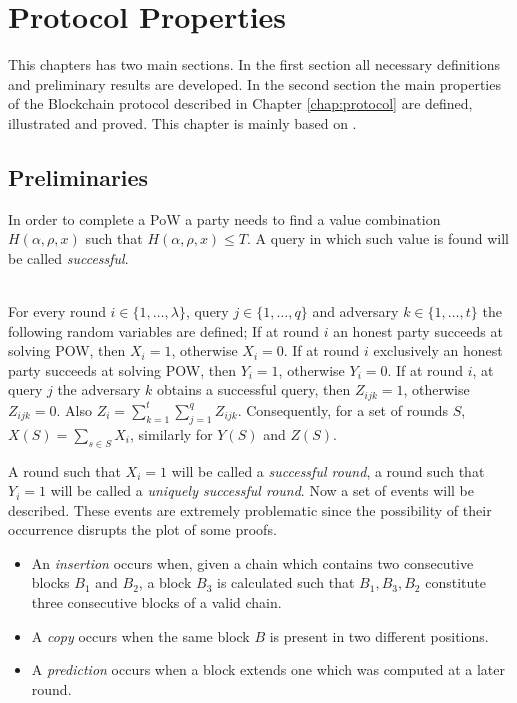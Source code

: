 \documentclass[..]{subfiles}
\begin{document}
\chapter{Protocol Properties}\label{chap:properties}

This chapters has two main sections. In the first section all necessary definitions and preliminary results are developed. In the second section the main properties of the Blockchain protocol described in Chapter \ref{chap:protocol} are defined, illustrated and proved. This chapter is mainly based on \cite{garay2015bitcoin}.


\section{Preliminaries}

In order to complete a PoW a party needs to find a value combination $H(\alpha, \rho, x)$ such that $H(\alpha, \rho, x) \le T$. A query in which such value is found will be called \textit{successful}.

\begin{definition}
	\mbox{}\\
	\normalfont
	For every round $i \in \{1,\dots,\lambda\}$, query $j \in \{1,\dots,q\}$ and adversary $k \in \{1, \dots,t\}$ the following random variables are defined; If at round $i$ an honest party succeeds at solving POW, then $X_i = 1$, otherwise $X_i = 0$. If at round $i$ exclusively an honest party succeeds at solving POW, then $Y_i = 1$, otherwise $Y_i = 0$. If at round $i$, at query $j$ the adversary $k$ obtains a successful query, then $Z_{ijk} = 1$, otherwise $Z_{ijk} = 0$. Also $Z_i = \sum_{k=1}^{t}{\sum_{j=1}^{q}{Z_{ijk}}}$. Consequently, for a set of rounds $S$, $X(S) = \sum_{s \in S}{X_i}$, similarly for $Y(S)$ and $Z(S)$.
\end{definition}

A round such that $X_i = 1$ will be called a \textit{successful round}, a round such that $Y_i = 1$ will be called a \textit{uniquely successful round}. Now a set of events will be described. These events are extremely problematic since the possibility of their occurrence disrupts the plot of some proofs.

\begin{definition}
	\mbox{}
	\normalfont

	\begin{itemize}
		\item An \textit{insertion} occurs when, given a chain which contains two consecutive blocks $B_1$ and $B_2$, a block $B_3$ is calculated such that $B_1, B_3, B_2$ constitute three consecutive blocks of a valid chain.
		\item A \textit{copy} occurs when the same block $B$ is present in two different positions.
		\item A \textit{prediction} occurs when a block extends one which was computed at a later round.
	\end{itemize}
\end{definition}
\end{document}
